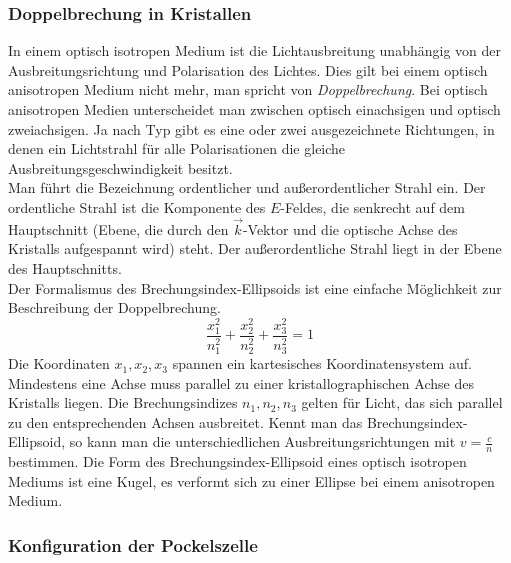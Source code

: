 \subsubsection{Doppelbrechung in Kristallen}
In einem optisch isotropen Medium ist die Lichtausbreitung unabhängig von der Ausbreitungsrichtung und Polarisation des Lichtes. Dies gilt bei 
einem optisch anisotropen Medium nicht mehr, man spricht von \emph{Doppelbrechung}. Bei optisch anisotropen Medien unterscheidet man zwischen 
optisch einachsigen und optisch zweiachsigen. Ja nach Typ gibt es eine oder zwei ausgezeichnete Richtungen, in denen ein Lichtstrahl für alle 
Polarisationen die gleiche Ausbreitungsgeschwindigkeit besitzt. \\
Man führt die Bezeichnung ordentlicher und außerordentlicher Strahl ein. Der ordentliche Strahl ist die Komponente des $E$-Feldes, die senkrecht 
auf dem Hauptschnitt (Ebene, die durch den $\vec{k}$-Vektor und die optische Achse des Kristalls aufgespannt wird) steht. Der außerordentliche 
Strahl liegt in der Ebene des Hauptschnitts.\\
Der Formalismus des Brechungsindex-Ellipsoids ist eine einfache Möglichkeit zur Beschreibung der Doppelbrechung. 
\begin{equation}
  \frac{x_1^2}{n_1^2 } +\frac{x_2^2}{n_2^2 } +\frac{x_3^2}{n_3^2 } = 1 
\end{equation}
Die Koordinaten $x_1, x_2, x_3$ spannen ein kartesisches Koordinatensystem auf. Mindestens eine Achse muss parallel zu einer kristallographischen 
Achse des Kristalls liegen. Die Brechungsindizes $n_1, n_2, n_3$ gelten für Licht, das sich parallel zu den entsprechenden Achsen ausbreitet. 
Kennt man das Brechungsindex-Ellipsoid, so kann man die unterschiedlichen Ausbreitungsrichtungen mit 
$v=\frac{c}{n}$ bestimmen. Die Form des Brechungsindex-Ellipsoid eines optisch isotropen Mediums ist eine Kugel, es verformt sich zu einer 
Ellipse bei einem anisotropen Medium.

\subsubsection{Konfiguration der Pockelszelle}
